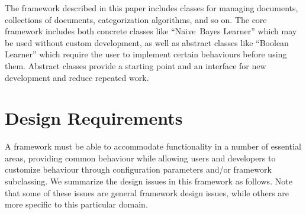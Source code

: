 \documentclass[twocolumn]{article}
\newcommand{\naive}{Na\"\i ve}
\begin{document}
The framework described in this paper includes classes for managing
documents, collections of documents, categorization algorithms, and so
on.  The core framework includes both concrete classes like ``\naive\
Bayes Learner'' which may be used without custom development, as
well as abstract classes like ``Boolean Learner'' which require the
user to implement certain behaviours before using them.  Abstract
classes provide a starting point and an interface for new development
and reduce repeated work.


\section{Design Requirements}

A framework must be able to accommodate functionality in a number of essential areas, providing common behaviour while allowing users and developers to customize behaviour through configuration parameters and/or framework subclassing.  We summarize the design issues in this framework as follows.  Note that some of these issues are general framework design issues, while others are more specific to this particular domain.
\end{document}
